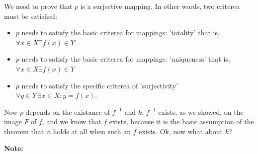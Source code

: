 \documentclass[11pt,a4paper]{article}
\newcommand{\note}[1]{%
  \par\medskip
  \noindent\textbf{Note:} #1
  \par\medskip
}
\begin{document}
We need to prove that $p$ is a surjective mapping. In other words, two criterea
must be satisfied:

\begin{itemize}
  \item $p$ needs to satisfy the basic criterea for mappings: 'totality'
        that is, $\forall x \in X \exists f(x) \in Y$
  \item $p$ needs to satisfy the basic criterea for mappings: 'uniqueness'
        that is, $\forall x \in X \exists f(x) \in Y$
  \item $p$ needs to satisfy the specific criterea of 'surjectivity'
        $\forall y \in Y \, \exists x \in X : y = f(x)$.
\end{itemize}

Now $p$ depends on the existance of $f^{-1}$ and $k$. $f^{-1}$ exists, as we
showed, on the image $F$ of $f$, and we know that $f$ exists, because it is
the basic assumption of the theorem that it holds at all when such an $f$
exists. Ok, now what about $k$?

\note{


}
\end{document}

